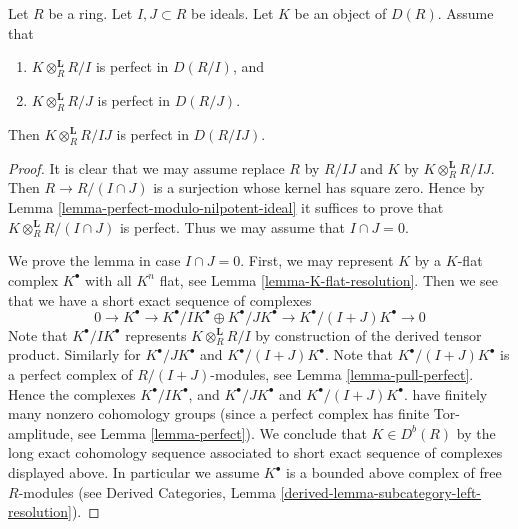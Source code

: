 \begin{lemma}
\label{lemma-perfect-modulo-two-ideals}
Let $R$ be a ring. Let $I, J \subset R$ be ideals.
Let $K$ be an object of $D(R)$. Assume that
\begin{enumerate}
\item $K \otimes_R^\mathbf{L} R/I$ is perfect in $D(R/I)$, and
\item $K \otimes_R^\mathbf{L} R/J$ is perfect in $D(R/J)$.
\end{enumerate}
Then $K \otimes_R^\mathbf{L} R/IJ$ is perfect in $D(R/IJ)$.
\end{lemma}

\begin{proof}
It is clear that we may assume replace $R$ by $R/IJ$ and $K$ by
$K \otimes_R^\mathbf{L} R/IJ$. Then $R \to R/(I \cap J)$ is
a surjection whose kernel has square zero. Hence by
Lemma \ref{lemma-perfect-modulo-nilpotent-ideal}
it suffices to prove that $K \otimes_R^\mathbf{L} R/(I \cap J)$ is
perfect. Thus we may assume that $I \cap J = 0$.

\medskip\noindent
We prove the lemma in case $I \cap J = 0$. First, we may represent $K$
by a $K$-flat complex $K^\bullet$ with all $K^n$ flat, see
Lemma \ref{lemma-K-flat-resolution}. Then we see that we have a short
exact sequence of complexes
$$
0 \to
K^\bullet \to K^\bullet/IK^\bullet \oplus K^\bullet/JK^\bullet \to
K^\bullet/(I + J)K^\bullet \to 0
$$
Note that $K^\bullet/IK^\bullet$ represents $K \otimes^\mathbf{L}_R R/I$
by construction of the derived tensor product. Similarly for
$K^\bullet/JK^\bullet$ and $K^\bullet/(I + J)K^\bullet$.
Note that $K^\bullet/(I + J)K^\bullet$ is a perfect complex
of $R/(I + J)$-modules, see
Lemma \ref{lemma-pull-perfect}.
Hence the complexes $K^\bullet/IK^\bullet$, and
$K^\bullet/JK^\bullet$ and $K^\bullet/(I + J)K^\bullet$.
have finitely many nonzero cohomology groups
(since a perfect complex has finite Tor-amplitude, see
Lemma \ref{lemma-perfect}). We conclude that $K \in D^b(R)$ by the
long exact cohomology sequence associated to short exact sequence
of complexes displayed above. In particular we assume $K^\bullet$
is a bounded above complex of free $R$-modules (see
Derived Categories, Lemma \ref{derived-lemma-subcategory-left-resolution}).


\end{proof}
